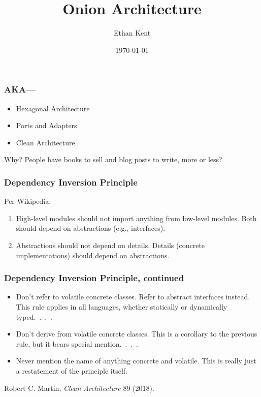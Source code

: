 \documentclass[aspectratio=169]{beamer}
\title{Onion Architecture}
\author{Ethan Kent}
\institute{Spoonflower}
\date{\today}
\begin{document}
\frame{\titlepage}

\begin{frame}
  \frametitle{AKA—}
  \begin{itemize}
    \item Hexagonal Architecture
    \item Ports and Adapters
    \item Clean Architecture
  \end{itemize}

  \vspace{1em}

  Why? People have books to sell and blog posts to write, more or less?
\end{frame}

\begin{frame}
  \frametitle{Dependency Inversion Principle}
  Per Wikipedia:

  \begin{enumerate}
    \item High-level modules should not import anything from low-level modules. Both should depend on abstractions (e.g., interfaces).
    \item Abstractions should not depend on details. Details (concrete implementations) should depend on abstractions.
  \end{enumerate}

\end{frame}

\begin{frame}
  \frametitle{Dependency Inversion Principle, continued}

  \begin{itemize}
    \item Don't refer to volatile concrete classes. Refer to abstract
          interfaces instead.  This rule applies in all languages, whether
          statically or dynamically typed.~.~.~.
    \item Don't derive from volatile concrete classes. This is a corollary to
          the previous rule, but it bears special mention.~.~.~.
    \item Never mention the name of anything concrete and volatile. This is
          really just a restatement of the principle itself.
  \end{itemize}
  \vspace{1em}

  Robert C. Martin, \textit{Clean Architecture} 89 (2018).
\end{frame}
\end{document}
